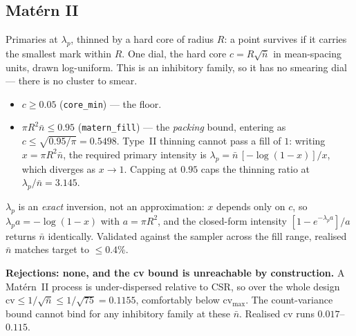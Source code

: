 \documentclass[11pt]{article}
\newcommand{\nb}{\bar n}
\newcommand{\cvmax}{\mathrm{cv}_{\max}}
\newcommand{\code}[1]{\texttt{#1}}
\begin{document}
\subsection*{Mat\'ern II}
Primaries at $\lambda_p$, thinned by a hard core of radius $R$: a point survives if it carries the smallest mark within $R$. One dial, the hard core $c=R\sqrt{\nb}$ in mean-spacing units, drawn log-uniform. This is an inhibitory family, so it has no smearing dial --- there is no cluster to smear.
\begin{itemize}
  \item $c\ge0.05$ (\code{core\_min}) --- the floor.
  \item $\pi R^2\nb\le0.95$ (\code{matern\_fill}) --- the \emph{packing} bound, entering as $c\le\sqrt{0.95/\pi}=0.5498$. Type~II thinning cannot pass a fill of $1$: writing $x=\pi R^2\nb$, the required primary intensity is $\lambda_p=\nb\,[-\log(1-x)]/x$, which diverges as $x\to1$. Capping at $0.95$ caps the thinning ratio at $\lambda_p/\nb = 3.145$.
\end{itemize}
$\lambda_p$ is an \emph{exact} inversion, not an approximation: $x$ depends only on $c$, so $\lambda_p a = -\log(1-x)$ with $a=\pi R^2$, and the closed-form intensity $[1-e^{-\lambda_p a}]/a$ returns $\nb$ identically. Validated against the sampler across the fill range, realised $\bar n$ matches target to $\le0.4\%$.

\textbf{Rejections: none, and the cv bound is unreachable by construction.} A Mat\'ern~II process is under-dispersed relative to CSR, so over the whole design $\mathrm{cv}\le1/\sqrt{\nb}\le1/\sqrt{75}=0.1155$, comfortably below $\cvmax$. The count-variance bound cannot bind for any inhibitory family at these $\nb$. Realised cv runs $0.017$--$0.115$.
\end{document}

